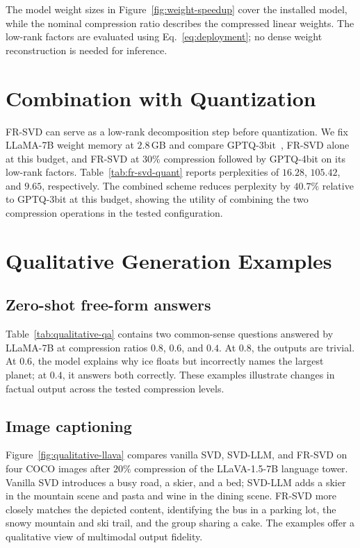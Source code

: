 The model weight sizes in Figure~\ref{fig:weight-speedup} cover the installed model, while the nominal compression ratio describes the compressed linear weights. The low-rank factors are evaluated using Eq.~\eqref{eq:deployment}; no dense weight reconstruction is needed for inference.

\section{Combination with Quantization}\label{app:quantization}
FR-SVD can serve as a low-rank decomposition step before quantization. We fix LLaMA-7B weight memory at $2.8$\,GB and compare GPTQ-3bit~\citep{frantar2023gptq}, FR-SVD alone at this budget, and FR-SVD at $30\%$ compression followed by GPTQ-4bit on its low-rank factors. Table~\ref{tab:fr-svd-quant} reports perplexities of $16.28$, $105.42$, and $9.65$, respectively. The combined scheme reduces perplexity by $40.7\%$ relative to GPTQ-3bit at this budget, showing the utility of combining the two compression operations in the tested configuration.



\section{Qualitative Generation Examples}\label{app:qualitative}

\subsection{Zero-shot free-form answers}
Table~\ref{tab:qualitative-qa} contains two common-sense questions answered by LLaMA-7B at compression ratios $0.8$, $0.6$, and $0.4$. At $0.8$, the outputs are trivial. At $0.6$, the model explains why ice floats but incorrectly names the largest planet; at $0.4$, it answers both correctly. These examples illustrate changes in factual output across the tested compression levels.



\subsection{Image captioning}
Figure~\ref{fig:qualitative-llava} compares vanilla SVD, SVD-LLM, and FR-SVD on four COCO images after $20\%$ compression of the LLaVA-1.5-7B language tower. Vanilla SVD introduces a busy road, a skier, and a bed; SVD-LLM adds a skier in the mountain scene and pasta and wine in the dining scene. FR-SVD more closely matches the depicted content, identifying the bus in a parking lot, the snowy mountain and ski trail, and the group sharing a cake. The examples offer a qualitative view of multimodal output fidelity.

